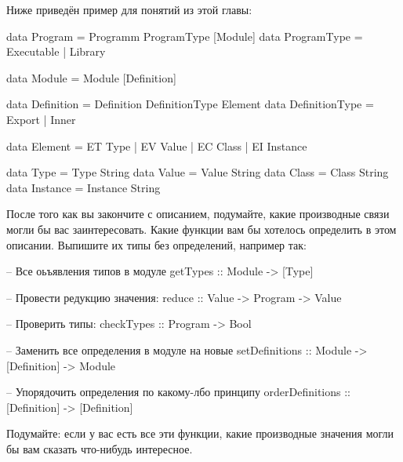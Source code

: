 Ниже приведён пример для понятий из этой главы:

\begin{code}
data Program = Programm ProgramType [Module]
data ProgramType = Executable | Library

data Module = Module [Definition]

data Definition = Definition DefinitionType Element
data DefinitionType = Export | Inner

data Element = ET Type | EV Value | EC Class | EI Instance

data Type     = Type String
data Value    = Value String
data Class    = Class String
data Instance = Instance String
\end{code}

После того как вы закончите с описанием, подумайте,
какие производные связи могли бы вас заинтересовать.
Какие функции вам бы хотелось определить в
этом описании. Выпишите их типы без определений, например так:


\begin{code}
-- Все оьъявления типов в модуле
getTypes :: Module -> [Type]

-- Провести редукцию значения:
reduce :: Value -> Program -> Value

-- Проверить типы:
checkTypes :: Program -> Bool

-- Заменить все определения в модуле на новые
setDefinitions    :: Module -> [Definition] -> Module

-- Упорядочить определения по какому-лбо принципу
orderDefinitions :: [Definition] -> [Definition]
\end{code}

Подумайте: если у вас есть все эти функции, какие производные
значения могли бы вам сказать что-нибудь интересное.

